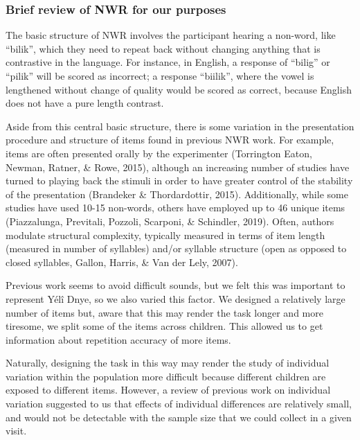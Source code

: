 \documentclass[english,,man,floatsintext]{apa6}
\begin{document}
\hypertarget{brief-review-of-nwr-for-our-purposes}{%
\subsubsection{Brief review of NWR for our purposes}\label{brief-review-of-nwr-for-our-purposes}}

The basic structure of NWR involves the participant hearing a non-word, like ``bilik'', which they need to repeat back without changing anything that is contrastive in the language. For instance, in English, a response of ``bilig'' or ``pilik'' will be scored as incorrect; a response ``biilik'', where the vowel is lengthened without change of quality would be scored as correct, because English does not have a pure length contrast.

Aside from this central basic structure, there is some variation in the presentation procedure and structure of items found in previous NWR work. For example, items are often presented orally by the experimenter (Torrington Eaton, Newman, Ratner, \& Rowe, 2015), although an increasing number of studies have turned to playing back the stimuli in order to have greater control of the stability of the presentation (Brandeker \& Thordardottir, 2015). Additionally, while some studies have used 10-15 non-words, others have employed up to 46 unique items (Piazzalunga, Previtali, Pozzoli, Scarponi, \& Schindler, 2019). Often, authors modulate structural complexity, typically measured in terms of item length (measured in number of syllables) and/or syllable structure (open as opposed to closed syllables, Gallon, Harris, \& Van der Lely, 2007).

Previous work seems to avoid difficult sounds, but we felt this was important to represent Yélî Dnye, so we also varied this factor. We designed a relatively large number of items but, aware that this may render the task longer and more tiresome, we split some of the items across children. This allowed us to get information about repetition accuracy of more items.

Naturally, designing the task in this way may render the study of individual variation within the population more difficult because different children are exposed to different items. However, a review of previous work on individual variation suggested to us that effects of individual differences are relatively small, and would not be detectable with the sample size that we could collect in a given visit.
\end{document}
